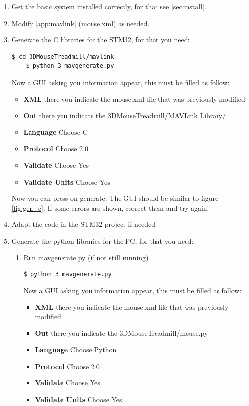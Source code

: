 \documentclass[12pt,a4paper, twoside]{article}
\begin{document}
\begin{enumerate}
	\item Get the basic system installed correctly, for that see \ref{sec:install}.
	\item Modify \ref{app:mavlink} (mouse.xml) as needed.
	\item Generate the C libraries for the STM32, for that you need:
	\begin{lstlisting}[style = Bashstyle]
	$ cd 3DMouseTreadmill/mavlink
	$ python 3 mavgenerate.py
	\end{lstlisting}
	Now a GUI asking you information appear, this must be filled as follow:
	\begin{itemize}
		\item \textbf{XML} there you indicate the mouse.xml file that was previously modified
		\item \textbf{Out} there you indicate the 3DMouseTreadmill/MAVLink Library/
		\item \textbf{Language} Choose C
		\item \textbf{Protocol} Choose 2.0
		\item \textbf{Validate} Choose Yes
		\item \textbf{Validate Units} Choose Yes
	\end{itemize}
	Now you can press on generate.
	The GUI should be similar to figure \ref{fig:gen_c}.
	If some errors are shown, correct them and try again.
	\item Adapt the code in the STM32 project if needed.
	\item Generate the python libraries for the PC, for that you need:
	\begin{enumerate}
		\item Run mavgenerate.py (if not still running)
		\begin{lstlisting}[style = Bashstyle]
		$ python 3 mavgenerate.py
		\end{lstlisting}
		Now a GUI asking you information appear, this must be filled as follow:
		\begin{itemize}
			\item \textbf{XML} there you indicate the mouse.xml file that was previously modified
			\item \textbf{Out} there you indicate the 3DMouseTreadmill/mouse.py
			\item \textbf{Language} Choose Python
			\item \textbf{Protocol} Choose 2.0
			\item \textbf{Validate} Choose Yes
			\item \textbf{Validate Units} Choose Yes

\end{itemize}
\end{enumerate}
\end{enumerate}
\end{document}
